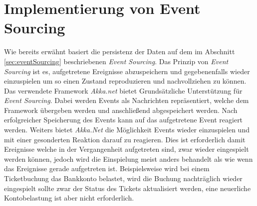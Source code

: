 \section{Implementierung von Event Sourcing}
\label{sec:implementation:eventSouring}
Wie bereits erwähnt basiert die persistenz der Daten auf dem im Abschnitt \ref{sec:eventSourcing} beschriebenen \textit{Event Sourcing}. Das Prinzip von \textit{Event Sourcing} ist es, aufgetretene Ereignisse abzuspeichern und gegebenenfalls wieder einzuspielen um so einen Zustand reproduzieren und nachvollziehen zu können. \\
Das verwendete Framework \textit{Akka.net} bietet Grundsätzliche Unterstützung für \textit{Event Sourcing}. Dabei werden Events als Nachrichten repräsentiert, welche dem Framework übergeben werden und anschließend abgespeichert werden. Nach erfolgreicher Speicherung des Events kann auf das aufgetretene Event reagiert werden. Weiters bietet \textit{Akka.Net} die Möglichkeit Events wieder einzuspielen und mit einer gesonderten Reaktion darauf zu reagieren. Dies ist erforderlich damit Ereignisse welche in der Vergangenheit aufgetreten sind, zwar wieder eingespielt werden können, jedoch wird die Einspielung meist anders behandelt als wie wenn das Ereignisse gerade aufgetreten ist. Beispielsweise wird bei einem Ticketbuchung das Bankkonto belastet, wird die Buchung nachträglich wieder eingespielt sollte zwar der Status des Tickets aktualisiert werden, eine neuerliche Kontobelastung ist aber nicht erforderlich. 

